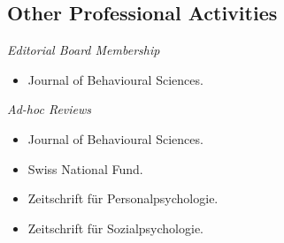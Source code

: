 

\subsection{Other Professional Activities}

\textit{Editorial Board Membership}

\begin{itemize}
\item Journal of Behavioural Sciences.
\end{itemize}

\textit{Ad-hoc Reviews}

\begin{itemize}
\item Journal of Behavioural Sciences.
\item Swiss National Fund.
\item Zeitschrift f\"ur Personalpsychologie.
\item Zeitschrift f\"ur Sozialpsychologie.
\end{itemize}





